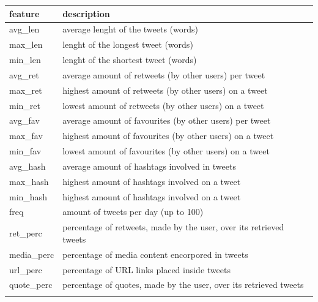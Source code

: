 \small
\begin{center}
	\begin{tabular}{ll}
		\\feature&description\\
		\hline\hline
		avg\_len&average lenght of the tweets (words)\\
		max\_len&lenght of the longest tweet (words)\\
		min\_len&lenght of the shortest tweet (words)\\
		avg\_ret&average amount of retweets (by other users) per tweet\\
		max\_ret&highest amount of retweets (by other users) on a tweet\\
		min\_ret&lowest amount of retweets (by other users) on a tweet\\
		avg\_fav&average amount of favourites (by other users) per tweet\\
		max\_fav&highest amount of favourites (by other users) on a tweet\\
		min\_fav&lowest amount of favourites (by other users) on a tweet\\
		avg\_hash&average amount of hashtags involved in tweets\\
		max\_hash&highest amount of hashtags involved on a tweet\\
		min\_hash&highest amount of hashtags involved on a tweet\\
		freq&amount of tweets per day (up to 100)\\
		ret\_perc&percentage of retweets, made by the user, over its retrieved tweets\\
		media\_perc&percentage of media content encorpored in tweets\\
		url\_perc&percentage of URL links placed inside tweets\\
		quote\_perc&percentage of quotes, made by the user, over its retrieved tweets\\\hline\\
	\end{tabular}
\end{center}
\normalsize

